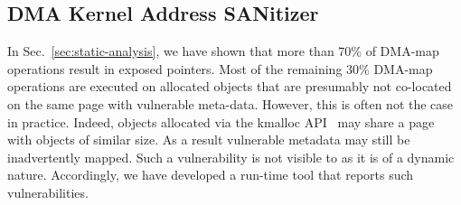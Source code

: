 \subsection{DMA Kernel Address SANitizer}\label{sec:dma-kasan} 

In Sec.~\ref{sec:static-analysis}, we have shown that more than 70\% of DMA-map operations result in exposed pointers. 
Most of the remaining 30\% DMA-map operations are executed on allocated objects that are presumably not co-located on the same page with vulnerable meta-data. However, this is often not the case in practice.
Indeed, objects allocated via the kmalloc API~\cite{Cor07} may share a page with objects of similar size. As a result vulnerable metadata may still be inadvertently mapped. 
%
Such a vulnerability is not visible to \tool as it is of a dynamic nature. Accordingly, we have developed a run-time tool that reports such vulnerabilities. 

